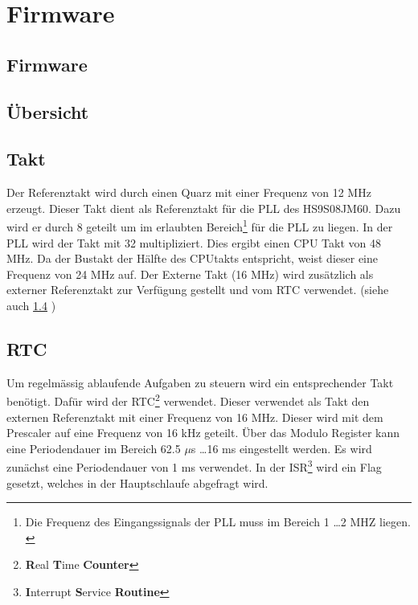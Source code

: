 \ifSTANDALONE
\section{Firmware}
\fi
\ifEMBED
\subsection{Firmware}
\fi

\subsection{Übersicht}

\subsection{Takt}
Der Referenztakt wird durch einen Quarz mit einer Frequenz von 12 MHz erzeugt. 
Dieser Takt dient als Referenztakt für die PLL des HS9S08JM60. Dazu wird er 
durch 8 geteilt um im erlaubten Bereich\footnote{Die Frequenz des 
Eingangssignals der PLL muss im Bereich 1 \ldots 2 MHZ liegen. \cite[p. 
195]{Datasheet:HCS08}} für die PLL zu liegen. In der PLL wird der Takt mit 32 
multipliziert. Dies ergibt einen CPU Takt von 48 MHz. Da der Bustakt der 
Hälfte des CPUtakts entspricht, weist dieser eine Frequenz von 24 MHz auf. 
Der Externe Takt (16 MHz) wird zusätzlich als externer Referenztakt zur 
Verfügung gestellt und vom RTC verwendet. 
(siehe auch \ref{sec:rtc} )

\subsection{RTC}
\label{sec:rtc}
Um regelmässig ablaufende Aufgaben zu steuern wird ein entsprechender Takt 
benötigt. Dafür wird der RTC\footnote{\textbf{R}eal \textbf{T}ime 
\textbf{Counter}} verwendet. Dieser verwendet als Takt den externen 
Referenztakt mit einer Frequenz von 16 MHz. Dieser wird mit dem Prescaler auf 
eine Frequenz von 16 kHz geteilt. Über das Modulo Register kann eine 
Periodendauer im Bereich 62.5 $\mu$s \ldots 16 ms eingestellt werden. Es wird 
zunächst eine Periodendauer von 1 ms verwendet. In der 
ISR\footnote{\textbf{I}nterrupt \textbf{S}ervice \textbf{Routine}} wird ein 
Flag gesetzt, welches in der Hauptschlaufe abgefragt wird. 


